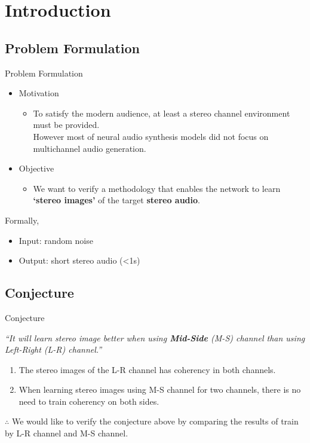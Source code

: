 \section{Introduction}
\subsection{Problem Formulation}
\begin{frame}{Problem Formulation}
    \begin{itemize}
        \item Motivation
        \begin{itemize}
            \item To satisfy the modern audience, at least a stereo channel environment must be provided.\\
            However most of neural audio synthesis models did not focus on multichannel audio generation.
        \end{itemize}
        \bigskip
        \item Objective
        \begin{itemize}
            \item We want to verify a methodology that enables the network to learn \textbf{`stereo images'} of the target \textbf{stereo audio}.
        \end{itemize}
        \bigskip
    \end{itemize}
\end{frame}
        \item Formally,
        \begin{itemize}
            \item Input: random noise
            \item Output: short stereo audio (<1s)
        \end{itemize}
\fi
\subsection{Conjecture}
\begin{frame}{Conjecture}
    \begin{center}
        \textit{``It will learn stereo image better when using \textbf{Mid-Side} (M-S) channel than using Left-Right (L-R) channel.''}
    \end{center}
    \bigskip
    \bigskip
    \smallskip
    \begin{enumerate}
        \item The stereo images of the L-R channel has coherency in both channels.
        \item When learning stereo images using M-S channel for two channels, there is no need to train coherency on both sides.
    \end{enumerate}
    \bigskip
    $\therefore$ We would like to verify the conjecture above by comparing the results of train by L-R channel and M-S channel.
\end{frame}
